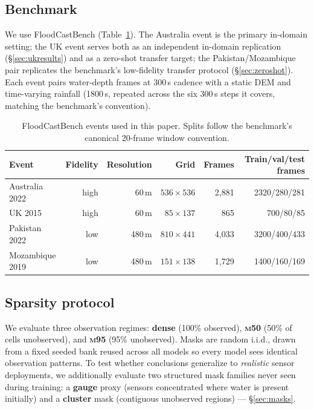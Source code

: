 \documentclass[11pt]{article}
\newcommand{\mfifty}{\textsc{m50}}
\newcommand{\mninetyfive}{\textsc{m95}}
\begin{document}
\subsection{Benchmark}
We use FloodCastBench \citep{floodcastbench2025}
(Table~\ref{tab:datasets}). The Australia event is the primary in-domain
setting; the UK event serves both as an independent in-domain replication
(\S\ref{sec:ukresults}) and as a zero-shot transfer target; the
Pakistan/Mozambique pair replicates the benchmark's low-fidelity transfer
protocol (\S\ref{sec:zeroshot}). Each event pairs water-depth frames at
300\,s cadence with a static DEM and time-varying rainfall (1800\,s,
repeated across the six 300\,s steps it covers, matching the benchmark's
convention).

\begin{table}[H]
\centering
\caption{FloodCastBench events used in this paper. Splits follow the
benchmark's canonical 20-frame window convention.}
\label{tab:datasets}
\begin{tabular}{lrrrrr}
\toprule
Event & Fidelity & Resolution & Grid & Frames & Train/val/test frames \\
\midrule
Australia 2022 & high & 60\,m & $536\times536$ & 2{,}881 & 2320/280/281 \\
UK 2015        & high & 60\,m & $85\times137$  & 865   & 700/80/85 \\
Pakistan 2022  & low  & 480\,m & $810\times441$ & 4{,}033 & 3200/400/433 \\
Mozambique 2019 & low & 480\,m & $151\times138$ & 1{,}729 & 1400/160/169 \\
\bottomrule
\end{tabular}
\end{table}

\subsection{Sparsity protocol}
We evaluate three observation regimes: \textbf{dense} (100\% observed),
\textbf{\mfifty} (50\% of cells unobserved), and \textbf{\mninetyfive}
(95\% unobserved). Masks are random i.i.d., drawn from a fixed seeded bank
reused across all models so every model sees identical observation
patterns. To test whether conclusions generalize to \emph{realistic}
sensor deployments, we additionally evaluate two structured mask families
never seen during training: a \textbf{gauge} proxy (sensors concentrated
where water is present initially) and a \textbf{cluster} mask (contiguous
unobserved regions) --- \S\ref{sec:masks}.
\end{document}
